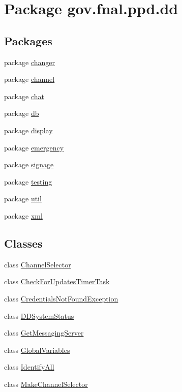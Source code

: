 \hypertarget{namespacegov_1_1fnal_1_1ppd_1_1dd}{\section{Package gov.\-fnal.\-ppd.\-dd}
\label{namespacegov_1_1fnal_1_1ppd_1_1dd}
}
\subsection*{Packages}
\begin{DoxyCompactItemize}
\item 
package \hyperlink{namespacegov_1_1fnal_1_1ppd_1_1dd_1_1changer}{changer}
\item 
package \hyperlink{namespacegov_1_1fnal_1_1ppd_1_1dd_1_1channel}{channel}
\item 
package \hyperlink{namespacegov_1_1fnal_1_1ppd_1_1dd_1_1chat}{chat}
\item 
package \hyperlink{namespacegov_1_1fnal_1_1ppd_1_1dd_1_1db}{db}
\item 
package \hyperlink{namespacegov_1_1fnal_1_1ppd_1_1dd_1_1display}{display}
\item 
package \hyperlink{namespacegov_1_1fnal_1_1ppd_1_1dd_1_1emergency}{emergency}
\item 
package \hyperlink{namespacegov_1_1fnal_1_1ppd_1_1dd_1_1signage}{signage}
\item 
package \hyperlink{namespacegov_1_1fnal_1_1ppd_1_1dd_1_1testing}{testing}
\item 
package \hyperlink{namespacegov_1_1fnal_1_1ppd_1_1dd_1_1util}{util}
\item 
package \hyperlink{namespacegov_1_1fnal_1_1ppd_1_1dd_1_1xml}{xml}
\end{DoxyCompactItemize}
\subsection*{Classes}
\begin{DoxyCompactItemize}
\item 
class \hyperlink{classgov_1_1fnal_1_1ppd_1_1dd_1_1ChannelSelector}{Channel\-Selector}
\item 
class \hyperlink{classgov_1_1fnal_1_1ppd_1_1dd_1_1CheckForUpdatesTimerTask}{Check\-For\-Updates\-Timer\-Task}
\item 
class \hyperlink{classgov_1_1fnal_1_1ppd_1_1dd_1_1CredentialsNotFoundException}{Credentials\-Not\-Found\-Exception}
\item 
class \hyperlink{classgov_1_1fnal_1_1ppd_1_1dd_1_1DDSystemStatus}{D\-D\-System\-Status}
\item 
class \hyperlink{classgov_1_1fnal_1_1ppd_1_1dd_1_1GetMessagingServer}{Get\-Messaging\-Server}
\item 
class \hyperlink{classgov_1_1fnal_1_1ppd_1_1dd_1_1GlobalVariables}{Global\-Variables}
\item 
class \hyperlink{classgov_1_1fnal_1_1ppd_1_1dd_1_1IdentifyAll}{Identify\-All}
\item 
class \hyperlink{classgov_1_1fnal_1_1ppd_1_1dd_1_1MakeChannelSelector}{Make\-Channel\-Selector}
\end{DoxyCompactItemize}


